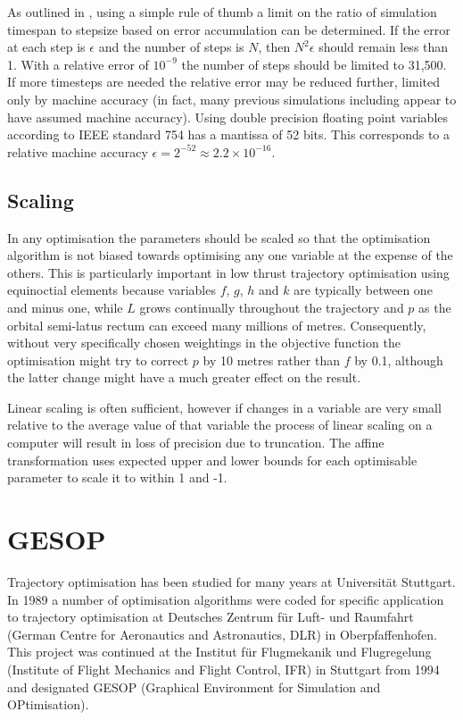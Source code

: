 As outlined in \textcite{Milani1987}, using a simple rule of thumb a limit on the ratio of simulation timespan to stepsize based on error accumulation can be determined. If the error at each step is $\epsilon$ and the number of steps is $N$, then $N^{2}\epsilon$ should remain less than 1. With a relative error of $10^{-9}$ the number of steps should be limited to 31,500. If more timesteps are needed the relative error may be reduced further, limited only by machine accuracy (in fact, many previous simulations including \citeauthor{Milani1987} appear to have assumed machine accuracy). Using double precision floating point variables according to IEEE standard 754 has a mantissa of 52 bits. This corresponds to a relative machine accuracy $\epsilon=2^{-52}\approx2.2\times10^{-16}$.

\subsection{Scaling} \label{sub:Scaling}

In any optimisation the parameters should be scaled so that the optimisation algorithm is not biased towards optimising any one variable at the expense of the others. This is particularly important in low thrust trajectory optimisation using equinoctial elements because variables $f$, $g$, $h$ and $k$ are typically between one and minus one, while $L$ grows continually throughout the trajectory and $p$ as the orbital semi-latus rectum can exceed many millions of metres. Consequently, without very specifically chosen weightings in the objective function the optimisation might try to correct $p$ by 10 metres rather than $f$ by 0.1, although the latter change might have a much greater effect on the result.

Linear scaling is often sufficient, however if changes in a variable are very small relative to the average value of that variable the process of linear scaling on a computer will result in loss of precision due to truncation. The affine transformation \parencite{ASTOS_guide} uses expected upper and lower bounds for each optimisable parameter to scale it to within 1 and -1.

\section{GESOP} \label{sec:GESOP}

Trajectory optimisation has been studied for many years at Universit\"{a}t Stuttgart. In 1989 a number of optimisation algorithms were coded for specific application to trajectory optimisation at Deutsches Zentrum f\"{u}r Luft- und Raumfahrt (German Centre for Aeronautics and Astronautics, DLR) in Oberpfaffenhofen. This project was continued at the Institut f\"{u}r Flugmekanik und Flugregelung (Institute of Flight Mechanics and Flight Control, IFR) in Stuttgart from 1994 and designated GESOP (Graphical Environment for Simulation and OPtimisation).
 
